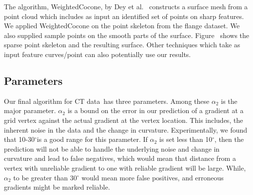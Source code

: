 The algorithm, WeightedCocone, by Dey et al.~\cite{dgqsww-fprss-12} constructs a surface mesh
from a point cloud which includes as input an identified set of points on sharp features.
We applied WeightedCocone on the point skeleton from the flange dataset.
We also supplied sample points on the smooth parts of the surface.
Figure~ shows the sparse point skeleton and the resulting surface.
Other techniques which take as input feature curves/point can also
potentially use our results.

\subsection{Parameters}
Our final algorithm for CT data~\ReliGrad  has three parameters.
Among these $\alpha_{2}$ is the major parameter. $\alpha_{2}$ is a bound on the error in our prediction of a gradient at a grid vertex against the actual gradient at the vertex location. This includes, the inherent noise in the data and the change in curvature. Experimentally, we found that 10-30$^{\circ}$is a good range for this parameter. If $\alpha_{2}$ is set less than 10$^{\circ}$,
then the prediction will not be able to handle the underlying noise and change in curvature and lead to false negatives, which would mean that distance from a vertex with unreliable gradient to one with reliable gradient will be large.
While,$\alpha_{2}$ to be greater than 30$^{\circ}$ would mean more false positives, and erroneous gradients might be  marked reliable. 

